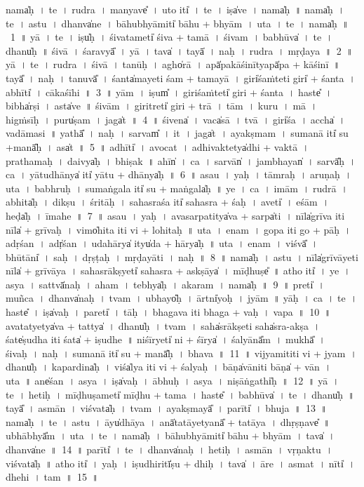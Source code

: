 \documentclass[parskip, DIV=14]{scrartcl}
\begin{document}
nama̍ḥ~। te॒~। ru॒dra॒~। ma॒nyave̎~। u॒to iti̍~। te॒~। iṣa̍ve~। nama̍ḥ~॥
nama̍ḥ~। te॒~। a॒stu॒~। dhanva̍ne~। bā॒hubhyā॒miti̍ bā॒hu + bhyā॒m~। u॒ta~। te॒~। nama̍ḥ~॥~1~॥
yā~। te॒~। iṣu̍ḥ~। śi॒vata॒meti̍ śi॒va + ta॒mā॒~। śi॒vam~। ba॒bhūva̍~। te॒~। dhanu̍ḥ~॥
śi॒vā~। śa॒ra॒vyā̎~। yā~। tava̍~। tayā̍~। na॒ḥ~। ru॒dra॒~। mṛ॒ḍa॒ya॒~॥~2~॥
yā~। te॒~। ru॒dra॒~। śi॒vā~। ta॒nūḥ~। agho̍rā~। apā̍pakāśi॒nītyapā̍pa + kā॒śi॒nī॒~॥
tayā̎~। na॒ḥ~। ta॒nuvā̎~। śanta̍ma॒yeti॒ śam + ta॒ma॒yā॒~। giri̍śa॒ṁteti॒ giri̍  + śa॒nta॒~। 
abhīti̍~। cā॒ka॒śī॒hi॒~॥~3~॥ 
yām~। iṣum̎~। gi॒ri॒śa॒ṁteti̍ giri + śa॒nta॒~। haste̎~। bibha̍rṣi~। asta̍ve~॥ 
śi॒vām~। gi॒ri॒treti̍ giri + trā~। tām~। ku॒ru॒~। mā~। hi॒gṁ॒sī॒ḥ~। puru̍ṣam~। jaga̍t~॥~4~॥ 
śi॒vena̍~। vaca̍sā~। tvā॒~। giri̍śa~। accha̍~। va॒dā॒ma॒si॒~॥ 
yathā̎~। na॒ḥ~। sarvam̎~। it~। jaga̍t~। a॒ya॒kṣmam~। su॒manā॒ iti̍ su +manā̎ḥ~। asa̍t~॥~5~॥
adhīti̍~। a॒vo॒ca॒t~। a॒dhi॒va॒ktetya̍dhi + va॒ktā~। pra॒tha॒maḥ~। daivya̍ḥ~। bhi॒ṣak~॥ 
a॒hīn̍~। ca॒~। sarvān̍~। ja॒mbhayan̍~। sarvā̎ḥ~। ca॒~। yā॒tu॒dhā॒nya̍ iti̍ yātu  + dhā॒nya̍ḥ~॥~6~॥
asau~। yaḥ~। tā॒mraḥ~। a॒ru॒ṇaḥ~। u॒ta~। ba॒bhruḥ~। su॒ma॒ṅgala॒ iti̍ su  + ma॒ṅgala̍ḥ~॥
ye~। ca॒~। i॒mām~। ru॒drā~। a॒bhita̍ḥ~। di॒kṣu~। 
śri॒tāḥ~। sa॒ha॒sra॒śa iti̍ sahasra + śaḥ~। aveti̍~। e॒śā॒m~। heḍa̍ḥ~। ī॒ma॒he॒~॥~7~॥
 asau~। yaḥ~। a॒va॒sarpa॒titya̍va  + sarpa̍ti~। nīla̍grīva॒ iti॒ nīla̍ + grīvaḥ~। 
vimo̍hita॒ iti॒ vi + lo॒hi॒ta॒ḥ~॥ u॒ta~। e॒na॒m~। gopa iti॒ go + pāḥ~। a॒dṛ॒śa॒n~। adṛ̍śan~। u॒da॒hā॒rya̍ ityu̍da + hā॒rya̍ḥ~॥
u॒ta~। e॒na॒m~। viśvā̎~। bhū॒tāni̍~। saḥ~। dṛ॒ṣṭaḥ~। mṛ॒ḍa॒yā॒ti॒~। na॒ḥ~॥~8~॥
nama̍ḥ~। a॒stu॒~। nīla̍grīvā॒yeti॒ nīla̍ + grī॒vā॒ya॒~। sa॒ha॒srā॒kṣyeti̍ sahasra + a॒skṣāya̍~। mī॒ḍhuṣe̎~॥ 
atho॒ iti̍~। ye~। a॒sya॒~। sattvā̍naḥ~। a॒ham~। tebhya̍ḥ~। a॒ka॒ra॒m~। nama̍ḥ~॥~9~॥
preti̍~। mu॒ñca॒~। dhanva̍naḥ~। tvam~। u॒bhayo̎ḥ~। ārtni̍yoḥ~। jyām~॥ 
yāḥ~। ca॒~। te॒~। haste̎~। iṣa̍vaḥ~। pareti̍~। tāḥ~। bha॒ga॒va॒ iti bhaga + va॒ḥ~। va॒pa॒~॥~10~॥
a॒va॒tatyetya̍va + tattya̍~। dhanu̍ḥ~। tvam~। saha̍srā॒kṣeti॒ saha̍sra-a॒kṣa॒~। śate̍ṣudha॒ iti॒ śata̍ + i॒ṣu॒dhe॒~॥ 
ni॒śīryeti̍ ni + śīrya̍~। śa॒lyānā̎m~। mukhā̎~। śi॒vaḥ~। na॒ḥ~। su॒manā॒ iti̍ su + manā̎ḥ~। bha॒va॒~॥~11~॥
vijya॒mititi॒ vi + jya॒m~। dhanu̍ḥ~। ka॒pa॒rdina̍ḥ~। viśa̍lya॒ iti॒ vi + śa॒lya॒ḥ~। bāṇa̍vā॒niti॒ bāṇa̍ + vā॒n~। u॒ta~॥ 
ane̍śan~। a॒sya॒~। iṣa̍vaḥ~। ā॒bhuḥ~। a॒sya॒~। ni॒ṣāṅgathi̍ḥ~॥~12~॥ 
yā~। te॒~। he॒tiḥ~। mī॒ḍhu॒ṣameti̍ mīḍhu + ta॒ma॒~। haste̎~। ba॒bhūva̍~। te॒~। dhanu̍ḥ~॥ 
tayā̎~। a॒smān~। vi॒śvata̍ḥ~। tvam~। a॒ya॒kṣmayā̎~। parīti̍~। bhu॒ja॒~॥~13~॥ 
nama̍ḥ~। te॒~। a॒stu॒~। āyu̍dhāya~। anā̍tatā॒yetyanā̎ + ta॒tā॒ya॒~। dhṛ॒ṣṇave̎~॥ 
u॒bhābhyā̎m~। uta~। te॒~। nama̍ḥ~। bā॒hubhy॒āmiti̍ bā॒hu + bhyā॒m~। tava̍~। dhanva̍ne~॥~14~॥ 
parīti̍~। te॒~। dhanva̍naḥ~। he॒tiḥ~। a॒smān~। vṛ॒ṇa॒ktu॒~। vi॒śvata̍ḥ~॥ 
atho॒ iti̍~। yaḥ~। i॒ṣu॒dhiritī̍ṣu + dhiḥ~। tava̍~। ā॒re~। a॒smat~। nīti̍~। dhe॒hi॒~। tam~॥~15~॥ 
\end{document}
